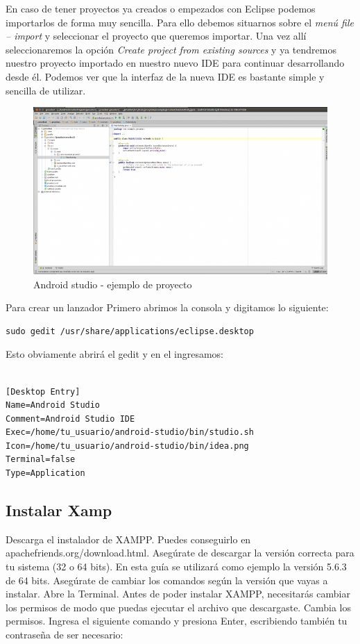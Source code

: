 En caso de tener proyectos ya creados o empezados con Eclipse podemos importarlos de forma muy sencilla. Para ello debemos situarnos sobre el \textit{menú file – import} y seleccionar el proyecto que queremos importar. Una vez allí seleccionaremos la opción \textit{Create project from existing sources} y ya tendremos nuestro proyecto importado en nuestro nuevo IDE para continuar desarrollando desde él. Podemos ver que la interfaz de la nueva IDE es bastante simple y sencilla de utilizar.

\begin{figure}[H]
	\centering
	\includegraphics[width=0.7\linewidth]{figuras/and-3}
	\caption{Android studio - ejemplo de proyecto }
	\label{fig:and3}
\end{figure}

\pagebreak

Para crear un lanzador Primero abrimos la consola y digitamos lo siguiente:
\begin{lstlisting}
sudo gedit /usr/share/applications/eclipse.desktop
\end{lstlisting}

Esto obviamente abrirá el gedit y en el ingresamos:

\begin{lstlisting}

[Desktop Entry]
Name=Android Studio
Comment=Android Studio IDE
Exec=/home/tu_usuario/android-studio/bin/studio.sh
Icon=/home/tu_usuario/android-studio/bin/idea.png
Terminal=false
Type=Application

\end{lstlisting}

\subsection{Instalar Xamp}
Descarga el instalador de XAMPP. Puedes conseguirlo en apachefriends.org/download.html. Asegúrate de descargar la versión correcta para tu sistema (32 o 64 bits). En esta guía se utilizará como ejemplo la versión 5.6.3 de 64 bits. Asegúrate de cambiar los comandos según la versión que vayas a instalar.
Abre la Terminal. Antes de poder instalar XAMPP, necesitarás cambiar los permisos de modo que puedas ejecutar el archivo que descargaste. 
Cambia los permisos. Ingresa el siguiente comando y presiona Enter, escribiendo también tu contraseña de ser necesario: 

